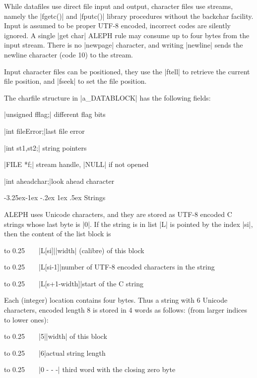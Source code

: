\documentclass{article}
\makeatletter
\newcommand\A{{\sf ALEPH}}
\renewcommand\subsection{%
\@startsection{subsection}{2}{\z@}%
   {-3.25ex\@plus -1ex \@minus -.2ex}%
   {1ex \@plus .5ex}%
   {\normalfont\normalsize\bfseries}}
\makeatother
\begin{document}
While datafiles use direct file input and output, character files use
streams, namely the \pp|fgetc()| and \pp|fputc()| library procedures without the
backchar facility. Input is assumed to be proper UTF-8 encoded, incorrect codes are
silently ignored. A single \pp|get char| \A{} rule may consume
up to four bytes from the input stream. There is no \pp|newpage| character,
and writing \pp|newline| sends the newline character (code 10) to the
stream.

Input character files can be positioned, they use the \pp|ftell| to retrieve
the current file position, and \pp|fseek| to set the file position.

The charfile structure in \pp|a\_DATABLOCK| has the following fields:
\medskip

\HH\pp|unsigned fflag;| \HE different flag bits

\HH\pp|int      fileError;|\HE last file error

\HH\pp|int      st1,st2;| \HE string pointers

\HH\pp|FILE     *f;|      \HE stream handle, \pp|NULL| if not opened

\HH\pp|int      aheadchar;|\HE look ahead character


\subsection{Strings}

\A{} uses Unicode characters, and they are stored as UTF-8 encoded {\sf C}
strings whose last byte is \pp|{}0|.
If the string is in list \pp|L| is pointed by the index \pp|si|, then the
content of the list block is

\def\HH{\noindent\hbox to 0.25\linewidth\bgroup~~~~}%
\smallskip

\HH\pp|L[si]|\HE \pp|width| (calibre) of this block

\HH\pp|L[si-1]|\HE number of UTF-8 encoded characters in the string

\HH\pp|L[s+1-width]|\HE start of the {\sf C} string

\smallskip
\noindent
Each (integer) location contains four bytes. Thus a string with 6 Unicode characters,
encoded length 8 is stored in 4 words as follows: (from larger indices to lower
ones):
\smallskip

\HH\pp|5|\HE  \pp|width| of this block

\HH\pp|6|\HE   actual string length

\HH\pp|{}0  -  -  -| \HE third word with the closing zero byte
\end{document}
